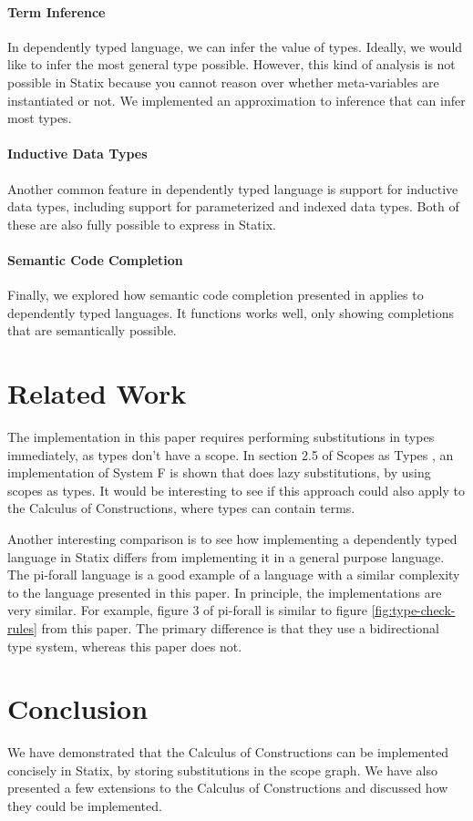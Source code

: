\documentclass[a4paper,UKenglish,cleveref, autoref, thm-restate]{oasics-v2021}
\begin{document}
\paragraph*{Term Inference}
In dependently typed language, we can infer the value of types. Ideally, we would like to infer the most general type possible. However, this kind of analysis is not possible in Statix because you cannot reason over whether meta-variables are instantiated or not. We implemented an approximation to inference that can infer most types.

\paragraph*{Inductive Data Types}
Another common feature in dependently typed language is support for inductive data types, including support for parameterized and indexed data types. Both of these are also fully possible to express in Statix. 

\paragraph*{Semantic Code Completion}
Finally, we explored how semantic code completion presented in \cite{codecompletion} applies to dependently typed languages. It functions works well, only showing completions that are semantically possible.


\section{Related Work}
The implementation in this paper requires performing substitutions in types immediately, as types don't have a scope. In section 2.5 of Scopes as Types \cite{scopes_as_types}, an implementation of System F is shown that does lazy substitutions, by using scopes as types. It would be interesting to see if this approach could also apply to the Calculus of Constructions, where types can contain terms. 

Another interesting comparison is to see how implementing a dependently typed language in Statix differs from implementing it in a general purpose language. The pi-forall language\cite{pi_forall} is a good example of a language with a similar complexity to the language presented in this paper. In principle, the implementations are very similar. For example, figure 3 of pi-forall is similar to figure \ref{fig:type-check-rules} from this paper. The primary difference is that they use a bidirectional type system, whereas this paper does not.

\section{Conclusion}

We have demonstrated that the Calculus of Constructions can be implemented concisely in Statix, by storing substitutions in the scope graph. We have also presented a few extensions to the Calculus of Constructions and discussed how they could be implemented.




\end{document}
